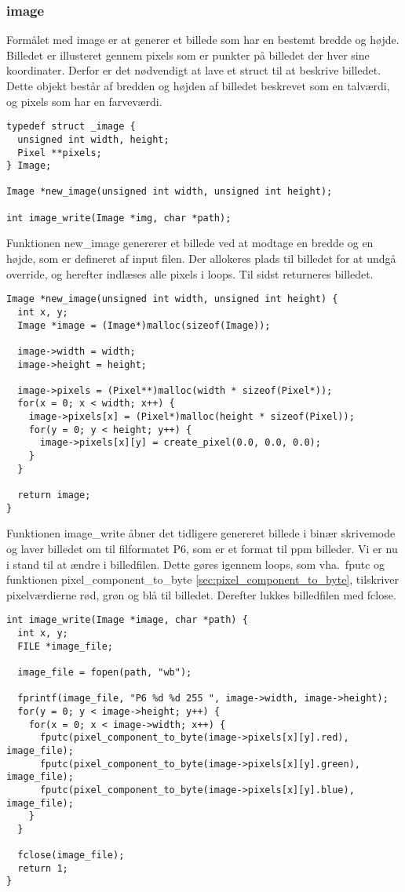 \subsubsection{image}
Formålet med image er at generer et billede som har en bestemt bredde og højde. Billedet er illusteret gennem pixels som er punkter på billedet der hver sine koordinater. Derfor er det nødvendigt at lave et struct til at beskrive billedet. Dette objekt består af bredden og højden af billedet beskrevet som en talværdi, og pixels som har en farveværdi.

\begin{lstlisting}[style=Cstyle, caption=light struct]
typedef struct _image {
  unsigned int width, height;
  Pixel **pixels;
} Image;

Image *new_image(unsigned int width, unsigned int height);

int image_write(Image *img, char *path);
\end{lstlisting}

Funktionen new\_image genererer et billede ved at modtage en bredde og en højde, som er defineret af input filen. Der allokeres plads til billedet for at undgå override, og herefter indlæses alle pixels i loops. Til sidst returneres billedet.

\begin{lstlisting}[style=Cstyle, caption=light struct]
Image *new_image(unsigned int width, unsigned int height) {
  int x, y;
  Image *image = (Image*)malloc(sizeof(Image));
  
  image->width = width;
  image->height = height;

  image->pixels = (Pixel**)malloc(width * sizeof(Pixel*));
  for(x = 0; x < width; x++) {
    image->pixels[x] = (Pixel*)malloc(height * sizeof(Pixel));
    for(y = 0; y < height; y++) {
      image->pixels[x][y] = create_pixel(0.0, 0.0, 0.0);
    }
  }

  return image;
}
\end{lstlisting}

Funktionen image\_write åbner det tidligere genereret billede i binær skrivemode og laver billedet om til filformatet P6, som er et format til ppm billeder. Vi er nu i stand til at ændre i billedfilen. Dette gøres igennem loops, som vha.\ fputc og funktionen pixel\_component\_to\_byte \ref{sec:pixel_component_to_byte}, tilskriver pixelværdierne rød, grøn og blå til billedet. Derefter lukkes billedfilen med fclose.  

\begin{lstlisting}[style=Cstyle, caption=light struct]
int image_write(Image *image, char *path) {
  int x, y;
  FILE *image_file;

  image_file = fopen(path, "wb");
  
  fprintf(image_file, "P6 %d %d 255 ", image->width, image->height);
  for(y = 0; y < image->height; y++) {
    for(x = 0; x < image->width; x++) {
      fputc(pixel_component_to_byte(image->pixels[x][y].red), image_file);
      fputc(pixel_component_to_byte(image->pixels[x][y].green), image_file);
      fputc(pixel_component_to_byte(image->pixels[x][y].blue), image_file);
    }
  }

  fclose(image_file);
  return 1;
}
\end{lstlisting}


